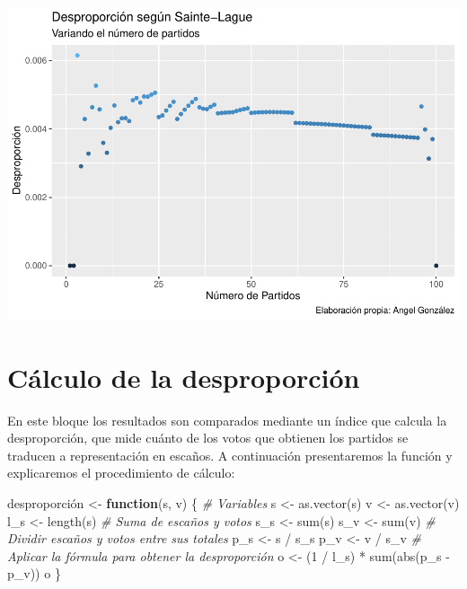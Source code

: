 \documentclass[12pt,a4paper,]{book}
\newenvironment{Shaded}{\begin{snugshade}}{\end{snugshade}}
\newcommand{\CommentTok}[1]{\textcolor[rgb]{0.56,0.35,0.01}{\textit{#1}}}
\newcommand{\ControlFlowTok}[1]{\textcolor[rgb]{0.13,0.29,0.53}{\textbf{#1}}}
\newcommand{\DecValTok}[1]{\textcolor[rgb]{0.00,0.00,0.81}{#1}}
\newcommand{\FunctionTok}[1]{\textcolor[rgb]{0.00,0.00,0.00}{#1}}
\newcommand{\NormalTok}[1]{#1}
\newcommand{\OtherTok}[1]{\textcolor[rgb]{0.56,0.35,0.01}{#1}}
\newcommand{\SpecialCharTok}[1]{\textcolor[rgb]{0.00,0.00,0.00}{#1}}
\numberwithin{dummy}{section}
\theoremstyle{ocrenumbox}
\theoremstyle{blacknumex}
\theoremstyle{blacknumbox}
\theoremstyle{ocrenum}
\theoremstyle{ocrenum}
\begin{document}
\begin{center}\includegraphics[width=0.95\linewidth]{figurasR/unnamed-chunk-12-1} \end{center}

\hypertarget{cuxe1lculo-de-la-desproporciuxf3n}{%
\section{Cálculo de la
desproporción}\label{cuxe1lculo-de-la-desproporciuxf3n}}

En este bloque los resultados son comparados mediante un índice que
calcula la desproporción, que mide cuánto de los votos que obtienen los
partidos se traducen a representación en escaños. A continuación
presentaremos la función y explicaremos el procedimiento de cálculo:

\begin{Shaded}
\begin{Highlighting}[]
\NormalTok{desproporción }\OtherTok{\textless{}{-}}
  \ControlFlowTok{function}\NormalTok{(s, v) \{  }\CommentTok{\# Variables}
\NormalTok{    s }\OtherTok{\textless{}{-}} \FunctionTok{as.vector}\NormalTok{(s)}
\NormalTok{    v }\OtherTok{\textless{}{-}} \FunctionTok{as.vector}\NormalTok{(v)}
\NormalTok{    l\_s }\OtherTok{\textless{}{-}} \FunctionTok{length}\NormalTok{(s)}
    \CommentTok{\# Suma de escaños y votos}
\NormalTok{    s\_s }\OtherTok{\textless{}{-}} \FunctionTok{sum}\NormalTok{(s)   }
\NormalTok{    s\_v }\OtherTok{\textless{}{-}} \FunctionTok{sum}\NormalTok{(v)}
    \CommentTok{\# Dividir escaños y votos entre sus totales}
\NormalTok{    p\_s }\OtherTok{\textless{}{-}}\NormalTok{ s }\SpecialCharTok{/}\NormalTok{ s\_s}
\NormalTok{    p\_v }\OtherTok{\textless{}{-}}\NormalTok{ v }\SpecialCharTok{/}\NormalTok{ s\_v}
    \CommentTok{\# Aplicar la fórmula para obtener la desproporción}
\NormalTok{    o }\OtherTok{\textless{}{-}}\NormalTok{ (}\DecValTok{1} \SpecialCharTok{/}\NormalTok{ l\_s) }\SpecialCharTok{*} \FunctionTok{sum}\NormalTok{(}\FunctionTok{abs}\NormalTok{(p\_s }\SpecialCharTok{{-}}\NormalTok{ p\_v))}
\NormalTok{    o}
\NormalTok{  \}}
\end{Highlighting}
\end{Shaded}
\end{document}
